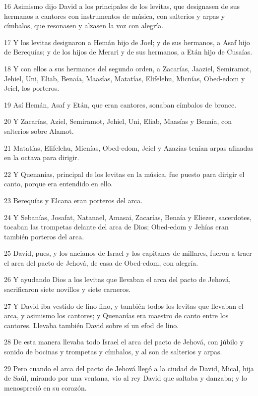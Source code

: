 \par 16 Asimismo dijo David a los principales de los levitas, que designasen de sus hermanos a cantores con instrumentos de música, con salterios y arpas y címbalos, que resonasen y alzasen la voz con alegría.
\par 17 Y los levitas designaron a Hemán hijo de Joel; y de sus hermanos, a Asaf hijo de Berequías; y de los hijos de Merari y de sus hermanos, a Etán hijo de Cusaías.
\par 18 Y con ellos a sus hermanos del segundo orden, a Zacarías, Jaaziel, Semiramot, Jehiel, Uni, Eliab, Benaía, Maasías, Matatías, Elifelehu, Micnías, Obed-edom y Jeiel, los porteros.
\par 19 Así Hemán, Asaf y Etán, que eran cantores, sonaban címbalos de bronce.
\par 20 Y Zacarías, Aziel, Semiramot, Jehiel, Uni, Eliab, Maasías y Benaía, con salterios sobre Alamot.
\par 21 Matatías, Elifelehu, Micnías, Obed-edom, Jeiel y Azazías tenían arpas afinadas en la octava para dirigir.
\par 22 Y Quenanías, principal de los levitas en la música, fue puesto para dirigir el canto, porque era entendido en ello.
\par 23 Berequías y Elcana eran porteros del arca.
\par 24 Y Sebanías, Josafat, Natanael, Amasai, Zacarías, Benaía y Eliezer, sacerdotes, tocaban las trompetas delante del arca de Dios; Obed-edom y Jehías eran también porteros del arca.
\par 25 David, pues, y los ancianos de Israel y los capitanes de millares, fueron a traer el arca del pacto de Jehová, de casa de Obed-edom, con alegría.
\par 26 Y ayudando Dios a los levitas que llevaban el arca del pacto de Jehová, sacrificaron siete novillos y siete carneros.
\par 27 Y David iba vestido de lino fino, y también todos los levitas que llevaban el arca, y asimismo los cantores; y Quenanías era maestro de canto entre los cantores. Llevaba también David sobre sí un efod de lino.
\par 28 De esta manera llevaba todo Israel el arca del pacto de Jehová, con júbilo y sonido de bocinas y trompetas y címbalos, y al son de salterios y arpas.
\par 29 Pero cuando el arca del pacto de Jehová llegó a la ciudad de David, Mical, hija de Saúl, mirando por una ventana, vio al rey David que saltaba y danzaba; y lo menospreció en su corazón.

